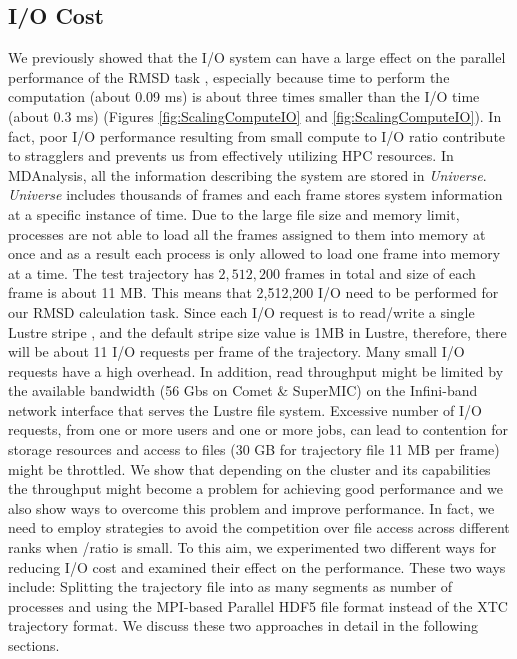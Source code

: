 \subsection{I/O Cost}
\label{I/O}
We previously showed that the I/O system can have a large effect on the parallel performance of the RMSD task \cite{Khoshlessan:2017ab},
especially because time to perform the computation \tcomp (about 0.09 ms) is about three times smaller than the I/O time \tIO (about 0.3 ms) (Figures \ref{fig:ScalingComputeIO} and \ref{fig:ScalingComputeIO}). 
In fact, poor I/O performance resulting from small compute to I/O ratio contribute to stragglers and prevents us from effectively utilizing HPC resources. 
In MDAnalysis, all the information describing the system are stored in \emph{Universe}.
\emph{Universe} includes thousands of frames and each frame stores system information at a specific instance of time.
Due to the large file size and memory limit, processes are not able to load all the frames assigned to them into memory at once and as a result each process is only allowed to load one frame into memory at a time.
The test trajectory has $2,512,200$ frames in total and size of each frame is about 11 MB.
This means that 2,512,200 I/O need to be performed for our RMSD calculation task.
Since each I/O request is to read/write a single Lustre stripe \cite{optimize_lustre}, and the default stripe size value is 1MB in Lustre, therefore, there will be about 11 I/O requests per frame of the trajectory.
Many small I/O requests have a high overhead. 
In addition, read throughput might be limited by the available bandwidth (56 Gbs on Comet \& SuperMIC) on the Infini-band network interface that serves the Lustre file system.
Excessive number of I/O requests, from one or more users and one or more jobs, can lead to contention for storage resources and access to files (30 GB for trajectory file 11 MB per frame) might be throttled.
We show that depending on the cluster and its capabilities the throughput might become a problem for achieving good performance and we also show ways to overcome this problem and improve performance.
In fact, we need to employ strategies to avoid the competition over file access across different ranks when \tcomp/\tIO ratio is small.
To this aim, we experimented two different ways for reducing I/O cost and examined their effect on the performance.
These two ways include: Splitting the trajectory file into as many segments as number of processes and using the MPI-based Parallel HDF5 file format instead of the XTC trajectory format.
We discuss these two approaches in detail in the following sections.

